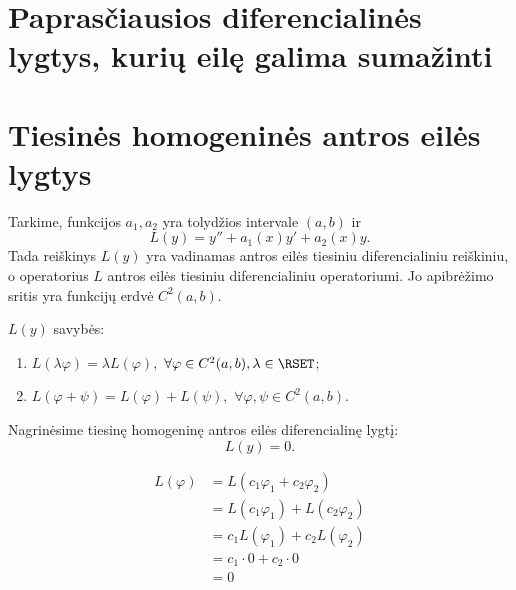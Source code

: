 
\section{Paprasčiausios diferencialinės lygtys, kurių eilę galima
sumažinti}

\cite[90]{konspektas}

\section{Tiesinės homogeninės antros eilės lygtys}

\cite[93]{konspektas}

\begin{defn}
  Tarkime, funkcijos $a_{1}, a_{2}$ yra tolydžios intervale $(a, b)$ ir
  \begin{equation*}
    L(y) = y'' + a_{1}(x)y' + a_{2}(x)y.
  \end{equation*}
  Tada reiškinys $L(y)$ yra vadinamas antros eilės tiesiniu
  diferencialiniu reiškiniu, o operatorius $L$ antros eilės tiesiniu
  diferencialiniu operatoriumi. Jo apibrėžimo sritis yra funkcijų
  erdvė $C^{2}(a, b)$.
\end{defn}

$L(y)$ savybės:
\begin{enumerate}
  \item $L(\lambda \varphi) = \lambda L(\varphi),$
    $\forall \varphi \in C^{2}(a, b), \lambda \in \RSET$;
  \item $L(\varphi + \psi) = L(\varphi) + L(\psi),$
    $\forall \varphi, \psi \in C^{2}(a, b)$.
\end{enumerate}

Nagrinėsime tiesinę homogeninę antros eilės diferencialinę lygtį:
\begin{equation*}
  L(y) = 0.
\end{equation*}

\begin{align*}
  L(\varphi)
  &= L(c_{1}\varphi_{1} + c_{2}\varphi_{2}) \\
  &= L(c_{1}\varphi_{1}) + L(c_{2}\varphi_{2}) \\
  &= c_{1}L(\varphi_{1}) + c_{2}L(\varphi_{2}) \\
  &= c_{1} \cdot 0 + c_{2} \cdot 0 \\
  &= 0 \\
\end{align*}

